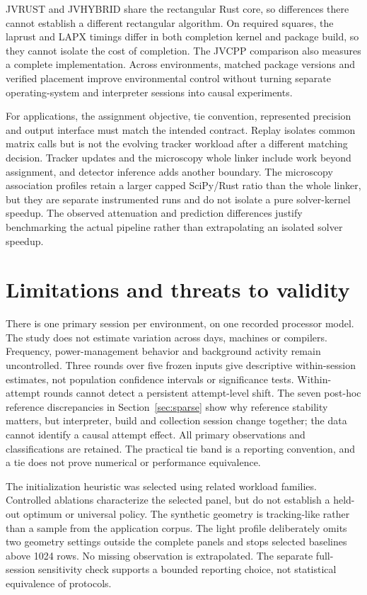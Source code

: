 \documentclass[11pt,a4paper]{article}
\begin{document}
JVRUST and JVHYBRID share the rectangular Rust core, so differences there cannot establish a different rectangular algorithm. On required squares, the laprust and LAPX timings differ in both completion kernel and package build, so they cannot isolate the cost of completion. The JVCPP comparison also measures a complete implementation. Across environments, matched package versions and verified placement improve environmental control without turning separate operating-system and interpreter sessions into causal experiments.

For applications, the assignment objective, tie convention, represented precision and output interface must match the intended contract. Replay isolates common matrix calls but is not the evolving tracker workload after a different matching decision. Tracker updates and the microscopy whole linker include work beyond assignment, and detector inference adds another boundary. The microscopy association profiles retain a larger capped SciPy/Rust ratio than the whole linker, but they are separate instrumented runs and do not isolate a pure solver-kernel speedup. The observed attenuation and prediction differences justify benchmarking the actual pipeline rather than extrapolating an isolated solver speedup.

\FloatBarrier
\section{Limitations and threats to validity}

There is one primary session per environment, on one recorded processor model. The study does not estimate variation across days, machines or compilers. Frequency, power-management behavior and background activity remain uncontrolled. Three rounds over five frozen inputs give descriptive within-session estimates, not population confidence intervals or significance tests. Within-attempt rounds cannot detect a persistent attempt-level shift. The seven post-hoc reference discrepancies in Section~\ref{sec:sparse} show why reference stability matters, but interpreter, build and collection session change together; the data cannot identify a causal attempt effect. All primary observations and classifications are retained. The practical tie band is a reporting convention, and a tie does not prove numerical or performance equivalence.

The initialization heuristic was selected using related workload families. Controlled ablations characterize the selected panel, but do not establish a held-out optimum or universal policy. The synthetic geometry is tracking-like rather than a sample from the application corpus. The light profile deliberately omits two geometry settings outside the complete panels and stops selected baselines above 1024 rows. No missing observation is extrapolated. The separate full-session sensitivity check supports a bounded reporting choice, not statistical equivalence of protocols.
\end{document}
